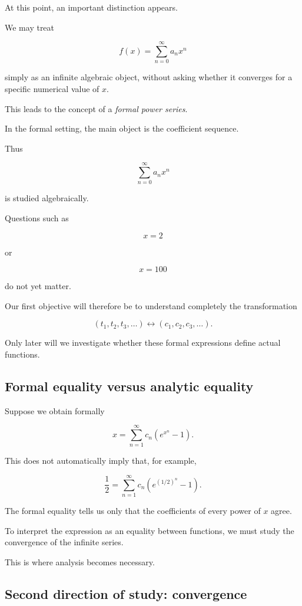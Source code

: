 At this point, an important distinction appears.

We may treat

\[
f(x)=\sum_{n=0}^{\infty}a_nx^n
\]

simply as an infinite algebraic object, without asking whether it converges
for a specific numerical value of \(x\).

This leads to the concept of a \emph{formal power series}.

In the formal setting, the main object is the coefficient sequence.

Thus

\[
\sum_{n=0}^{\infty}a_nx^n
\]

is studied algebraically.

Questions such as

\[
x=2
\]

or

\[
x=100
\]

do not yet matter.

Our first objective will therefore be to understand completely the
transformation

\[
(t_1,t_2,t_3,\ldots)
\longleftrightarrow
(c_1,c_2,c_3,\ldots).
\]

Only later will we investigate whether these formal expressions define
actual functions.

\subsection{Formal equality versus analytic equality}

Suppose we obtain formally

\[
x
=
\sum_{n=1}^{\infty}
c_n(e^{x^n}-1).
\]

This does not automatically imply that, for example,

\[
\frac12
=
\sum_{n=1}^{\infty}
c_n
\left(
e^{(1/2)^n}-1
\right).
\]

The formal equality tells us only that the coefficients of every power of
\(x\) agree.

To interpret the expression as an equality between functions, we must study
the convergence of the infinite series.

This is where analysis becomes necessary.

\subsection{Second direction of study: convergence}

